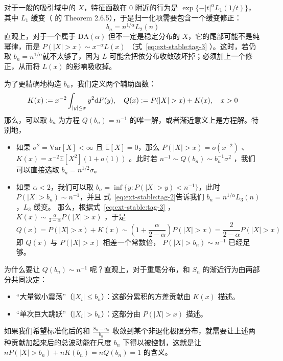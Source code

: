 对于一般的吸引域中的 $X$，特征函数在 $0$ 附近的行为是 $\exp\{ -|t|^\alpha L_1(1/t) \}$，其中 $L_1$ 缓变（\cite{ibragimov1971} 的 Theorem 2.6.5），于是归一化项需要包含一个缓变修正：
\[b_n = n^{1/\alpha} L_2(n)\]
直观上，对于一个属于 $\mathrm{DA}(\alpha)$ 但不一定是稳定分布的 $X$，它的尾部可能不是纯幂律，而是 $P(|X|>x) \sim x^{-\alpha} L(x)$ （式~\eqref{eq:ext-stable:tag-3} ）。这时，若仍取 $b_n = n^{1/\alpha}$就不太够了，因为 $L$ 可能会把依分布收敛破坏掉；必须加上一个修正，从而将 $L(x)$ 的影响吸收掉。

为了更精确地构造 $b_n$，我们定义两个辅助函数：
\[K(x) := x^{-2} \int_{|y|\le x} y^2 {\rm d}F(y), \quad Q(x) := P(|X| > x) + K(x), \quad x > 0\]
那么，可以取 $b_n$ 为方程 $Q(b_n) = n^{-1}$ 的唯一解，或者渐近意义上是方程解。特别地，

\begin{itemize}
\tightlist
\item
  如果 $\sigma^2 = \mathrm{Var}[X] < \infty$ 且 $\mathbb E[X] = 0$，那么 $P(|X|>x)=o(x^{-2})$ 、 $K(x)=x^{-2}\mathbb{E}[X^2](1+o(1))$ 。此时若 $n^{-1}\sim Q(b_n)\sim b_n^{-1}\sigma^2$ ，我们可以直接选取 $b_n =n^{1/2} \sigma$。
\item
  如果 $\alpha < 2$，我们可以取 $b_n = \inf\{ y : P(|X| > y) < n^{-1} \}$，此时 $P(|X| > b_n) \sim n^{-1}$，并且 式~\eqref{eq:ext-stable:tag-2}告诉我们 $b_n = n^{1/\alpha} L_3(n)$，$L_3$ 缓变。 那么，根据式~\eqref{eq:ext-stable:tag-3} ， $K(x) \sim \frac{\alpha}{2-\alpha}P(|X|>x)$ ，于是\[ Q(x) = P(|X|>x)+ K(x) \sim \left(1 + \frac{\alpha}{2-\alpha}\right) P(|X|>x) = \frac{2}{2-\alpha} P(|X|>x) \] 即 $Q(x)$ 与 $P(|X|>x)$ 相差一个常数倍， $P(|X| > b_n) \sim n^{-1}$ 已经足够。
\end{itemize}

为什么要让 $Q(b_n)\sim n^{-1}$ 呢？直观上，对于重尾分布，和 $S_n$ 的渐近行为由两部分共同决定：

\begin{itemize}
\tightlist
\item
  ``大量微小震荡''（$|X_i| \le b_n$）：这部分累积的方差贡献由 $K(x)$ 描述。
\item
  ``单次巨大跳跃''（$|X_i| > b_n$）：这部分由 $P(|X|>x)$ 描述。
\end{itemize}

如果我们希望标准化后的和 $\frac{S_n - a_n}{b_n}$ 收敛到某个非退化极限分布，就需要让上述两种贡献加起来后的总波动能在尺度 $b_n$ 下得以被控制，这就是让 $nP(|X|>b_n)+nK(b_n)=nQ(b_n)=1$ 的含义。


